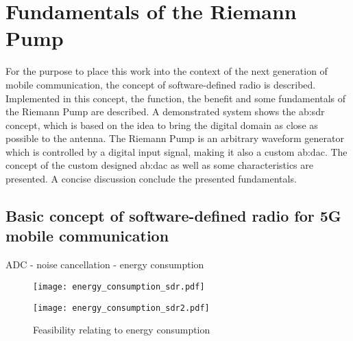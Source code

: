\chapter{Fundamentals of the Riemann Pump}
\label{ch:fundamentals}
For the purpose to place this work into the context of the next generation of mobile communication, the concept of software-defined radio is described.
Implemented in this concept, the function, the benefit and some fundamentals of the Riemann Pump are described. 
A demonstrated system shows the \gls{ab:sdr} concept, which is based on the idea to bring the digital domain as close as possible to the antenna.
The Riemann Pump is an arbitrary waveform generator which is controlled by a digital input signal, making it also a custom \gls{ab:dac}.
The concept of the custom designed \gls{ab:dac} as well as some characteristics are presented.
A concise discussion conclude the presented fundamentals.

\section{Basic concept of software-defined radio for 5G mobile communication}
ADC - noise cancellation - energy consumption

\begin{figure}[htbp]
	\begin{minipage}{0.49\linewidth} 
	\texttt{[image: energy\_consumption\_sdr.pdf]}
	\label{energy1} 
	\end{minipage}
	\hfill
	\begin{minipage}{0.49\linewidth}
	\texttt{[image: energy\_consumption\_sdr2.pdf]}
	\label{energy2} 
	\end{minipage}
 \caption{Feasibility relating to energy consumption}
\end{figure}

